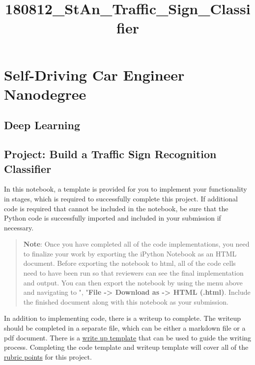 \documentclass[11pt]{article}
\title{180812\_StAn\_Traffic\_Sign\_Classifier}
\begin{document}
    
    
    \maketitle
    
    

    
    \section{Self-Driving Car Engineer
Nanodegree}\label{self-driving-car-engineer-nanodegree}

\subsection{Deep Learning}\label{deep-learning}

\subsection{Project: Build a Traffic Sign Recognition
Classifier}\label{project-build-a-traffic-sign-recognition-classifier}

In this notebook, a template is provided for you to implement your
functionality in stages, which is required to successfully complete this
project. If additional code is required that cannot be included in the
notebook, be sure that the Python code is successfully imported and
included in your submission if necessary.

\begin{quote}
\textbf{Note}: Once you have completed all of the code implementations,
you need to finalize your work by exporting the iPython Notebook as an
HTML document. Before exporting the notebook to html, all of the code
cells need to have been run so that reviewers can see the final
implementation and output. You can then export the notebook by using the
menu above and navigating to \n", "\textbf{File -\textgreater{} Download
as -\textgreater{} HTML (.html)}. Include the finished document along
with this notebook as your submission.
\end{quote}

In addition to implementing code, there is a writeup to complete. The
writeup should be completed in a separate file, which can be either a
markdown file or a pdf document. There is a
\href{https://github.com/udacity/CarND-Traffic-Sign-Classifier-Project/blob/master/writeup_template.md}{write
up template} that can be used to guide the writing process. Completing
the code template and writeup template will cover all of the
\href{https://review.udacity.com/\#!/rubrics/481/view}{rubric points}
for this project.
\end{document}

